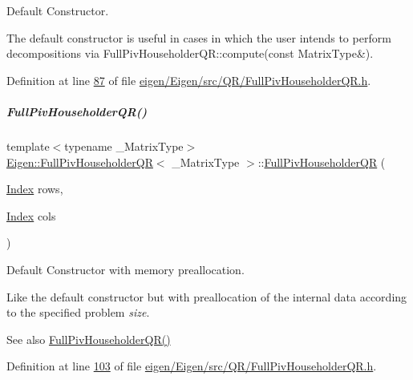 Default Constructor. 

The default constructor is useful in cases in which the user intends to perform decompositions via Full\+Piv\+Householder\+Q\+R\+::compute(const Matrix\+Type\&). 

Definition at line \hyperlink{eigen_2_eigen_2src_2_q_r_2_full_piv_householder_q_r_8h_source_l00087}{87} of file \hyperlink{eigen_2_eigen_2src_2_q_r_2_full_piv_householder_q_r_8h_source}{eigen/\+Eigen/src/\+Q\+R/\+Full\+Piv\+Householder\+Q\+R.\+h}.

\mbox{\label{group___q_r___module_abf722e1dc7241a5d6f76460ef0c87821}} 
\subparagraph{\texorpdfstring{Full\+Piv\+Householder\+Q\+R()}{FullPivHouseholderQR()}\hspace{0.1cm}{\footnotesize\ttfamily [2/8]}}
{\footnotesize\ttfamily template$<$typename \+\_\+\+Matrix\+Type$>$ \\
\hyperlink{group___q_r___module_class_eigen_1_1_full_piv_householder_q_r}{Eigen\+::\+Full\+Piv\+Householder\+QR}$<$ \+\_\+\+Matrix\+Type $>$\+::\hyperlink{group___q_r___module_class_eigen_1_1_full_piv_householder_q_r}{Full\+Piv\+Householder\+QR} (\begin{DoxyParamCaption}\item[{\hyperlink{namespace_eigen_a62e77e0933482dafde8fe197d9a2cfde}{Index}}]{rows,  }\item[{\hyperlink{namespace_eigen_a62e77e0933482dafde8fe197d9a2cfde}{Index}}]{cols }\end{DoxyParamCaption})\hspace{0.3cm}{\ttfamily [inline]}}



Default Constructor with memory preallocation. 

Like the default constructor but with preallocation of the internal data according to the specified problem {\itshape size}. \begin{DoxySeeAlso}{See also}
\hyperlink{group___q_r___module_aeb14b4c1eef33128207b40a00bd0bd08}{Full\+Piv\+Householder\+Q\+R()} 
\end{DoxySeeAlso}


Definition at line \hyperlink{eigen_2_eigen_2src_2_q_r_2_full_piv_householder_q_r_8h_source_l00103}{103} of file \hyperlink{eigen_2_eigen_2src_2_q_r_2_full_piv_householder_q_r_8h_source}{eigen/\+Eigen/src/\+Q\+R/\+Full\+Piv\+Householder\+Q\+R.\+h}.

